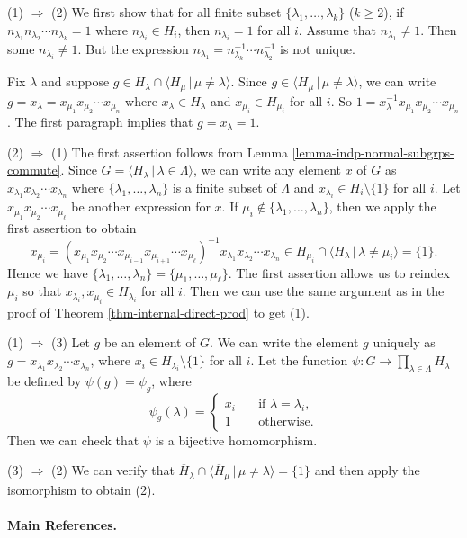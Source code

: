 \begin{sketch}
	(1) $\Rightarrow$ (2) We first show that for all finite subset $\{\lambda_1,\dots, \lambda_k\}$ ($k\geq 2$), if $n_{\lambda_1}n_{\lambda_2}\cdots n_{\lambda_k} = 1$ where $n_{\lambda_i}\in H_i$, then $n_{\lambda_i} = 1$ for all $i$. Assume that $n_{\lambda_1} \neq 1$. Then some $n_{\lambda_i}\neq 1$. But the expression $n_{\lambda_1} = n_{\lambda_k}^{-1} \cdots n_{\lambda_2}^{-1}$ is not unique.
	
	Fix $\lambda$ and suppose $g \in H_\lambda \cap \langle H_\mu\,|\, \mu \neq \lambda \rangle$. Since $g \in \langle H_\mu\,|\, \mu \neq \lambda \rangle $, we can write $g=x_{\lambda}  = x_{\mu_1} x_{\mu_2} \cdots x_{\mu_n}$ where $x_\lambda\in H_\lambda$ and  $x_{\mu_i} \in H_{\mu_i}$ for all $i$. So $1 = x_{\lambda}^{-1} x_{\mu_1} x_{\mu_2} \cdots x_{\mu_n}$. The first paragraph implies that $g = x_{\lambda} = 1$.
	
	
	(2) $\Rightarrow$ (1) The first assertion follows from Lemma \ref{lemma-indp-normal-subgrps-commute}. Since $G = \langle H_\lambda\,|\, \lambda \in \Lambda \rangle$, we can write any element $x$ of $G$  as $x_{\lambda_1} x_{\lambda_2} \cdots x_{\lambda_n}$ where $\{\lambda_1,\dots, \lambda_n\}$ is a finite subset of $\Lambda$ and $x_{\lambda_i} \in H_i\setminus\{1\}$ for all $i$. Let $x_{\mu_1} x_{\mu_2} \cdots x_{\mu_\ell}$ be another expression for $x$. If $\mu_i \not\in\{\lambda_1,\dots, \lambda_n\}$, then we apply the first assertion to obtain $$x_{\mu_i} = (x_{\mu_1} x_{\mu_2} \cdots x_{\mu_{i-1}} x_{\mu_{i+1}} \cdots x_{\mu_\ell})^{-1}x_{\lambda_1} x_{\lambda_2} \cdots x_{\lambda_n} \in H_{\mu_i} \cap \langle H_\lambda\,|\, \lambda \neq \mu_i \rangle = \{1\}.$$ Hence we have $\{\lambda_1,\dots, \lambda_n\} = \{\mu_1,\dots, \mu_\ell\}$. The first assertion allows us to reindex $\mu_i$ so that $x_{\lambda_i},x_{\mu_i}\in H_{\lambda_i}$ for all $i$. Then we can use the same argument as in the proof of Theorem \ref{thm-internal-direct-prod} to get (1). 
	
	(1) $\Rightarrow$ (3)  Let $g$ be an element of $G$. We can write the element $g$ uniquely as $g = x_{\lambda_1} x_{\lambda_2} \cdots x_{\lambda_n}$, where $x_i \in H_{\lambda_i}\setminus\{1\}$ for all $i$. Let the function $\psi: G \rightarrow \prod_{\lambda\in\Lambda} H_\lambda$ be defined by $\psi(g) = \psi_g$, where
	\begin{equation*}
		\psi_g(\lambda) =  \begin{cases}
			x_i &\quad \text{if } \lambda = \lambda_i,
			\\
			1 &\quad \text{otherwise}.
		\end{cases}
	\end{equation*}Then we can check that $\psi$ is a bijective homomorphism.
	
	(3) $\Rightarrow$ (2) We can verify that $\overline{H}_\lambda \cap \langle \overline{H}_\mu\,|\, \mu \neq \lambda \rangle= \{1\}$ and then apply the isomorphism to obtain (2).
\end{sketch}

\paragraph{Main References.} \cite{Suzuki1982,Hungerford1974,Isaacs2009,Robinson1982}
